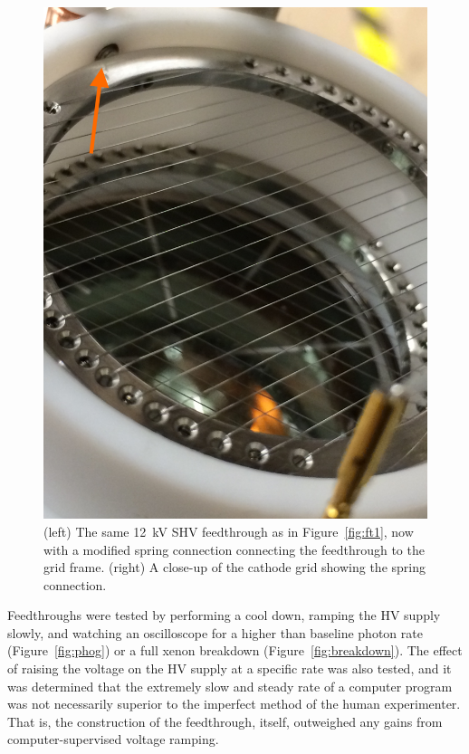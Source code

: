 \begin{figure}[htbp]
\begin{center}
\includegraphics[width=\halffig]{figures/testbed/ft2_2.jpg}
\caption{ (left) The same 12~kV \acs{SHV} feedthrough as in Figure~\ref{fig:ft1}, now with a modified spring connection connecting the feedthrough to the grid frame. (right) A close-up of the cathode grid showing the spring connection.}
\label{fig:ft2_1}
\end{center}
\end{figure}


Feedthroughs were tested by performing a cool down, ramping the \ac{HV} supply slowly, and watching an oscilloscope for a higher than baseline photon rate (Figure~\ref{fig:phog}) or a full xenon breakdown (Figure~\ref{fig:breakdown}). The effect of raising the voltage on the \ac{HV} supply at a specific rate was also tested, and it was determined that the extremely slow and steady rate of a computer program was not necessarily superior to the imperfect method of the human experimenter. That is, the construction of the feedthrough, itself, outweighed any gains from computer-supervised voltage ramping.  


